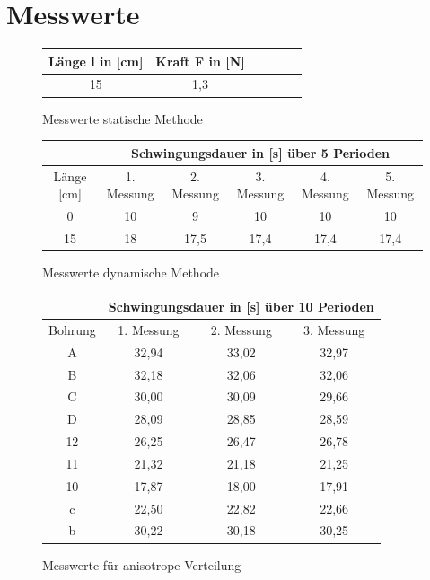 \documentclass[fontsize=12pt]{scrartcl}
\begin{document}
\section{ Messwerte}
\begin{figure}[h!]
\vspace{-10pt}
\centering
\caption{Messwerte statische Methode}
\begin{tabular}{|c|c|c|c|c|c|} \hline
Länge l in [cm] & Kraft F in [N]\\ \hline
15&	1,3\\ \hline
\end{tabular}
\end{figure}
\begin{figure}[h!]
\vspace{-10pt}
\centering
\caption{Messwerte dynamische Methode}
\begin{tabular}{|c|c|c|c|c|c|} \hline
 &\multicolumn{5}{|c|}{Schwingungsdauer in [s] über 5 Perioden}\\ \hline
Länge [cm] &1. Messung	&2. Messung	&3. Messung&4. Messung&5. Messung\\ \hline
0&10&	9	&10	&10	&10\\ \hline
15&18&	17,5	&17,4	&17,4	&17,4\\ \hline
\end{tabular}
\end{figure}
\begin{figure}[h!]
\vspace{-10pt}
\centering
\caption{Messwerte für anisotrope Verteilung}
\begin{tabular}{|c|c|c|c|} \hline
&\multicolumn{3}{|c|}{Schwingungsdauer in [s] über 10 Perioden}\\ \hline
Bohrung &1. Messung	&2. Messung	&3. Messung\\ \hline
A		&32,94	&33,02	&32,97	\\ \hline
B		&32,18	&32,06	&32,06	\\ \hline
C		&30,00	&30,09	&29,66	\\ \hline
D		&28,09	&28,85	&28,59	\\ \hline
12	&26,25	&26,47	&26,78	\\ \hline
11		&21,32	&21,18	&21,25	\\ \hline
10	&17,87	&18,00	&17,91	\\ \hline
 c		&22,50	&22,82	&22,66	\\ \hline
 b		&30,22	&30,18	&30,25	\\ \hline
\end{tabular}
\end{figure}
\end{document}
